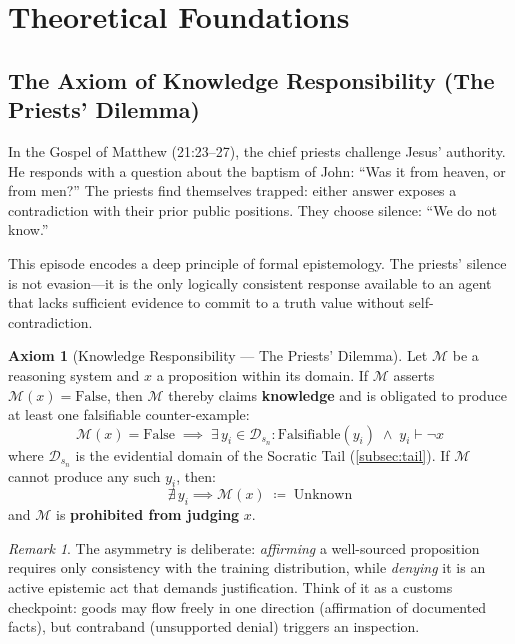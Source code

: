 \documentclass[11pt,a4paper]{article}
\theoremstyle{definition}
\newtheorem{axiom}{Axiom}
\theoremstyle{plain}
\theoremstyle{remark}
\newtheorem{remark}{Remark}[section]
\begin{document}
\section{Theoretical Foundations}\label{sec:foundations}

\subsection{The Axiom of Knowledge Responsibility (The Priests' Dilemma)}
\label{subsec:priests-dilemma}

In the Gospel of Matthew (21:23--27), the chief priests challenge Jesus' authority. He responds with a question about the baptism of John: ``Was it from heaven, or from men?'' The priests find themselves trapped: either answer exposes a contradiction with their prior public positions. They choose silence: ``We do not know.''

This episode encodes a deep principle of formal epistemology. The priests' silence is not evasion---it is the only logically consistent response available to an agent that lacks sufficient evidence to commit to a truth value without self-contradiction.

\begin{axiom}[Knowledge Responsibility --- The Priests' Dilemma]
\label{ax:priests-dilemma}
\label{ax:priests}
Let $\mathcal{M}$ be a reasoning system and $x$ a proposition within its domain. If $\mathcal{M}$ asserts $\mathcal{M}(x) = \mathrm{False}$, then $\mathcal{M}$ thereby claims \textbf{knowledge} and is obligated to produce at least one falsifiable counter-example:
\begin{equation}\label{eq:priests}
  \mathcal{M}(x) = \mathrm{False}
  \;\implies\;
  \exists\, y_i \in \mathcal{D}_{s_n} : \mathrm{Falsifiable}(y_i) \;\wedge\; y_i \vdash \neg x
\end{equation}
where $\mathcal{D}_{s_n}$ is the evidential domain of the Socratic Tail (\cref{subsec:tail}). If $\mathcal{M}$ cannot produce any such $y_i$, then:
\begin{equation}\label{eq:unknown}
  \nexists\, y_i \implies \mathcal{M}(x) \;\coloneqq\; \mathrm{Unknown}
\end{equation}
and $\mathcal{M}$ is \textbf{prohibited from judging} $x$.
\end{axiom}

\begin{remark}
The asymmetry is deliberate: \emph{affirming} a well-sourced proposition requires only consistency with the training distribution, while \emph{denying} it is an active epistemic act that demands justification. Think of it as a customs checkpoint: goods may flow freely in one direction (affirmation of documented facts), but contraband (unsupported denial) triggers an inspection.
\end{remark}
\end{document}
